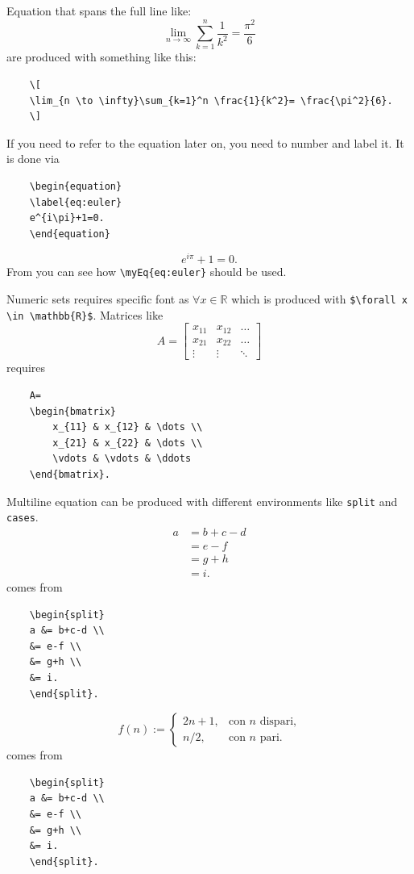 Equation that spans the full line like:
\[
\lim_{n \to \infty}\sum_{k=1}^n \frac{1}{k^2}= \frac{\pi^2}{6}
\]
are produced with something like this:
\begin{verbatim}
	\[
	\lim_{n \to \infty}\sum_{k=1}^n \frac{1}{k^2}= \frac{\pi^2}{6}.
	\]
\end{verbatim}
If you need to refer to the equation later on, you need to number and label it. It is done via
\begin{verbatim}
	\begin{equation}
	\label{eq:euler}
	e^{i\pi}+1=0.
	\end{equation}
\end{verbatim}
\begin{equation}
	\label{eq:euler}
	e^{i\pi}+1=0.
\end{equation}
From  you can see how \verb!\myEq{eq:euler}! should be used.

Numeric sets requires specific font as $\forall x \in \mathbb{R}$ which is produced with \verb!$\forall x \in \mathbb{R}$!. Matrices like
\[
A=
\begin{bmatrix}
x_{11} & x_{12} & \dots \\
x_{21} & x_{22} & \dots \\
\vdots & \vdots & \ddots
\end{bmatrix}
\]
requires
\begin{verbatim}
	A=
	\begin{bmatrix}
		x_{11} & x_{12} & \dots \\
		x_{21} & x_{22} & \dots \\
		\vdots & \vdots & \ddots
	\end{bmatrix}.
\end{verbatim}
Multiline equation can be produced with different environments like \verb!split! and \verb!cases!.
\[ 
\begin{split} 
a &= b+c-d \\ 
  &= e-f \\ 
  &= g+h \\ 
  &= i. 
\end{split} 
\]
comes from
\begin{verbatim}
	\begin{split} 
	a &= b+c-d \\ 
 	&= e-f \\ 
	&= g+h \\ 
	&= i. 
	\end{split}. 
\end{verbatim}
\[
f(n):=
\begin{cases} 
2n+1, & \text{con $n$ dispari,} \\ 
n/2,  & \text{con $n$ pari.} 
\end{cases} 
\]
comes from
\begin{verbatim}
	\begin{split} 
	a &= b+c-d \\ 
 	&= e-f \\ 
	&= g+h \\ 
	&= i. 
	\end{split}. 
\end{verbatim}

